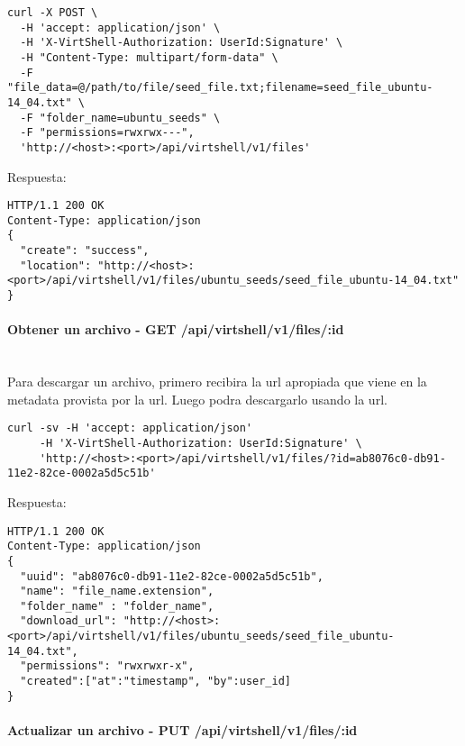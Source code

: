 \begin{lstlisting}[style=json]
curl -X POST \
  -H 'accept: application/json' \
  -H 'X-VirtShell-Authorization: UserId:Signature' \
  -H "Content-Type: multipart/form-data" \
  -F "file_data=@/path/to/file/seed_file.txt;filename=seed_file_ubuntu-14_04.txt" \
  -F "folder_name=ubuntu_seeds" \
  -F "permissions=rwxrwx---",
  'http://<host>:<port>/api/virtshell/v1/files'
\end{lstlisting}

\vspace{1cm}
Respuesta:
\vspace{1cm}

\begin{lstlisting}[style=json]
HTTP/1.1 200 OK
Content-Type: application/json
{ 
  "create": "success",
  "location": "http://<host>:<port>/api/virtshell/v1/files/ubuntu_seeds/seed_file_ubuntu-14_04.txt" 
}
\end{lstlisting}

\paragraph{Obtener un archivo - GET /api/virtshell/v1/files/:id} ~\\

Para descargar un archivo, primero recibira la url apropiada que viene en la metadata provista por la url. Luego podra descargarlo usando la url.

\begin{lstlisting}[style=json]
curl -sv -H 'accept: application/json' 
     -H 'X-VirtShell-Authorization: UserId:Signature' \ 
     'http://<host>:<port>/api/virtshell/v1/files/?id=ab8076c0-db91-11e2-82ce-0002a5d5c51b'
\end{lstlisting}

\vspace{1cm}
Respuesta:
\vspace{1cm}

\begin{lstlisting}[style=json]
HTTP/1.1 200 OK
Content-Type: application/json
{
  "uuid": "ab8076c0-db91-11e2-82ce-0002a5d5c51b",
  "name": "file_name.extension",
  "folder_name" : "folder_name",
  "download_url": "http://<host>:<port>/api/virtshell/v1/files/ubuntu_seeds/seed_file_ubuntu-14_04.txt",
  "permissions": "rwxrwxr-x",
  "created":["at":"timestamp", "by":user_id] 
}
\end{lstlisting}

\paragraph{Actualizar un archivo - PUT /api/virtshell/v1/files/:id} ~\\


